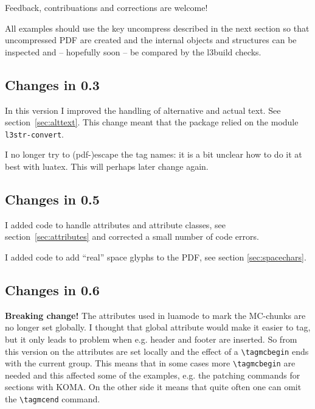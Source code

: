 \documentclass[DIV=12,parskip=half-,bibliography=totoc]{scrartcl}
\newcommand\PrintKeyName[1]{\textsf{#1}}
\newcommand\PDF{PDF}
\begin{document}
\begin{tcolorbox}[before upper=\tagpdfparaOn]
Feedback, contribuations and corrections are welcome!
\end{tcolorbox}


All examples should use the  key \PrintKeyName{uncompress} described in the next section so that uncompressed \PDF{} are created and the internal objects and structures can be inspected and -- hopefully soon -- be compared by the l3build checks.%



\subsection{Changes in 0.3}


In this version I improved the handling of alternative and actual text. See section~\ref{sec:alttext}. This change meant that the package relied on the module \texttt{l3str-convert}.

I no longer try to (pdf-)escape the tag names: it is a bit unclear how to do it at best with luatex. This will perhaps later change again.




\subsection{Changes in 0.5}


I added code to handle attributes and attribute classes, see section~\ref{sec:attributes} and corrected a small number of code errors.

I added code to add \enquote{real} space glyphs to the \PDF{}, see section \ref{sec:spacechars}.



\subsection{Changes in 0.6}



\textbf{Breaking change!} The attributes used in luamode to mark the MC-chunks are no longer set globally. I thought that global attribute would make it easier to tag, but it only leads to problem when e.g. header and footer are inserted. So from this version on the attributes are set locally and the effect of a \verb+\tagmcbegin+ ends with the current group. This means that in some cases more \verb+\tagmcbegin+ are needed and  this affected some of the examples, e.g. the patching commands for sections with KOMA. On the other side it means that quite often one can omit the \verb+\tagmcend+ command.
\end{document}

